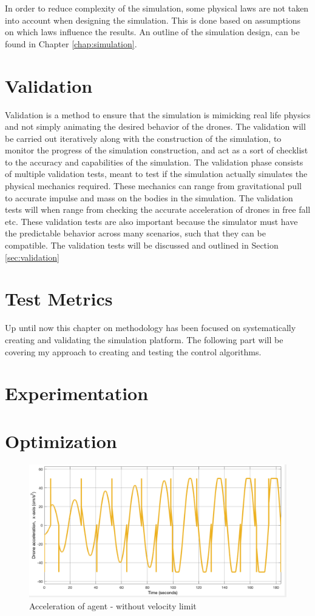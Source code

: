 In order to reduce complexity of the simulation, some physical laws are not taken into account when designing the simulation. This is done based on assumptions on which laws influence the results. An outline of the simulation design, can be found in Chapter \ref{chap:simulation}. 

\section{Validation}
Validation is a method to ensure that the simulation is mimicking real life physics and not simply animating the desired behavior of the drones. The validation will be carried out iteratively along with the construction of the simulation, to monitor the progress of the simulation construction, and act as a sort of checklist to the accuracy and capabilities of the simulation. The validation phase consists of multiple validation tests, meant to test if the simulation actually simulates the physical mechanics required. These mechanics can range from gravitational pull to accurate impulse and mass on the bodies in the simulation. The validation tests will when range from checking the accurate acceleration of drones in free fall etc. These validation tests are also important because the simulator must have the predictable behavior across many scenarios, such that they can be compatible. The validation tests will be discussed and outlined in Section \ref{sec:validation}

\section{Test Metrics}
Up until now this chapter on methodology has been focused on systematically creating and validating the simulation platform. The following part will be covering my approach to creating and testing the control algorithms. 



\section{Experimentation}

\section{Optimization}



\begin{figure}[h!]
  \centering
  \includegraphics[width=.8\columnwidth]{figures/SA_accel_with_no_vel_limit.png}
  \caption{Acceleration of agent - without velocity limit}
  \label{fig:sa_accel_no_vel_adj}
\end{figure}






